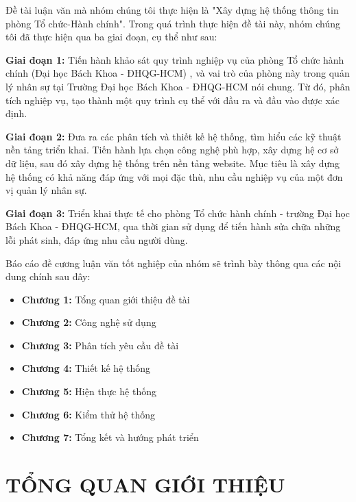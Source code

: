\documentclass[12pt, a4paper]{report}
\begin{document}
\begin{sumary}
    Đề tài luận văn mà nhóm chúng tôi thực hiện là "Xây dựng hệ thống thông tin phòng Tổ chức-Hành chính". Trong quá trình thực hiện đề tài này, nhóm chúng tôi đã thực hiện qua ba giai đoạn, cụ thể như sau:

\textbf{Giai đoạn 1: } Tiến hành khảo sát quy trình nghiệp vụ của phòng Tổ chức hành chính (Đại học Bách Khoa - ĐHQG-HCM) , và vai trò của phòng này trong quản lý nhân sự tại Trường Đại học Bách Khoa - ĐHQG-HCM nói chung. Từ đó, phân tích nghiệp vụ, tạo thành một quy trình cụ thể với đầu ra và đầu vào được xác định.

\textbf{Giai đoạn 2: } Đưa ra các phân tích và thiết kế hệ thống, tìm hiểu các kỹ thuật nền tảng triển khai. Tiến hành lựa chọn công nghệ phù hợp, xây dựng hệ cơ sở dữ liệu, sau đó xây dựng hệ thống trên nền tảng website. Mục tiêu là xây dựng hệ thống có khả năng đáp ứng với mọi đặc thù, nhu cầu nghiệp vụ của một đơn vị quản lý nhân sự.

\textbf{Giai đoạn 3: } Triển khai thực tế cho phòng Tổ chức hành chính - trường Đại học Bách Khoa - ĐHQG-HCM, qua thời gian sử dụng để tiến hành sửa chữa những lỗi phát sinh, đáp ứng nhu cầu người dùng.

    Báo cáo đề cương luận văn tốt nghiệp của nhóm sẽ trình bày thông qua các nội dung chính sau đây:
    \begin{itemize}
        \item \textbf{Chương 1:} Tổng quan giới thiệu đề tài
        \item \textbf{Chương 2:} Công nghệ sử dụng
        \item \textbf{Chương 3:} Phân tích yêu cầu đề tài
        \item \textbf{Chương 4:} Thiết kế hệ thống
        \item \textbf{Chương 5:} Hiện thực hệ thống
        \item \textbf{Chương 6:} Kiểm thử hệ thống
        \item \textbf{Chương 7:} Tổng kết và hướng phát triển
    \end{itemize}
\end{sumary}
\tableofcontents
\newpage
\listoffigures
\newpage
\listoftables
\newpage

\chapter{\textbf{TỔNG QUAN GIỚI THIỆU }}
\newpage

\newpage
\end{document}
